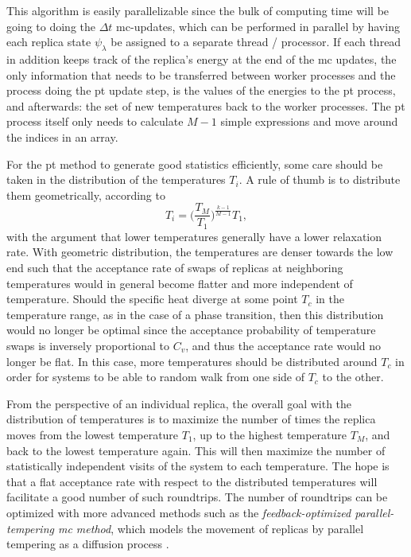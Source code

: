 This algorithm is easily parallelizable since the bulk of computing time will be going to doing the $\Delta t$ \ac{mc}-updates, which can
be performed in parallel by having each replica state $\psi_\lambda$ be assigned to a separate thread / processor. If each thread in addition
keeps track of the replica's energy at the end of the \ac{mc} updates, the only information that needs to be transferred between worker processes and
the process doing the \ac{pt} update step, is the values of the energies to the \ac{pt} process, and afterwards: the set of new temperatures
back to the worker processes. The \ac{pt} process itself only needs to 
calculate $M-1$ simple expressions and move around the indices in an array.

For the \ac{pt} method to generate good statistics efficiently, some care should be taken in the distribution of the temperatures $T_i$.
A rule of thumb is to distribute them geometrically, \ie according to
\begin{equation}
    \label{eq:Monte:PT:geometricTemperatures}
    T_i = \bigg(\frac{T_M}{T_1}\bigg)^{\frac{k-1}{M-1}}T_1,
\end{equation}
with the argument that lower temperatures generally have a lower relaxation rate. With geometric distribution, the temperatures are denser towards
the low end such that the acceptance rate of swaps of replicas at neighboring temperatures would in general become flatter and more independent of temperature.
Should the specific heat diverge at some point $T_c$ in the temperature range, as in the case of a phase transition, then this distribution would no
longer be optimal since the acceptance probability of temperature swaps is inversely proportional to $C_v$, and thus the acceptance rate would no
longer be flat. In this case, more temperatures should be distributed around $T_c$ in order for systems to be able to random walk from one side
of $T_c$ to the other.

From the perspective of an individual replica, the overall goal with the distribution of temperatures is to maximize the number of times the replica moves
from the lowest temperature $T_1$, up to the highest temperature $T_M$, and back to the lowest temperature again. This will then maximize the number
of statistically independent visits of the system to each temperature. The hope is that a flat acceptance rate with respect to the distributed
temperatures will facilitate a good number of such roundtrips. The number of roundtrips can be optimized with more advanced methods such as the
\emph{feedback-optimized parallel-tempering \ac{mc} method}, which models the movement of replicas by parallel tempering as a diffusion process \cite{Katzgraber06}.

